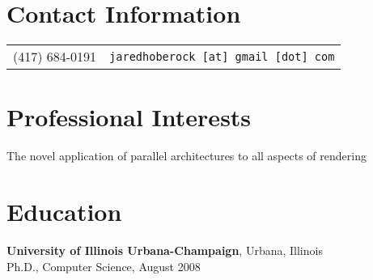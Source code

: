 \documentclass[margin,line]{res}
\newenvironment{list1}{
  \begin{list}{\ding{113}}{%
      \setlength{\itemsep}{0in}
      \setlength{\parsep}{0in} \setlength{\parskip}{0in}
      \setlength{\topsep}{0in} \setlength{\partopsep}{0in}
      \setlength{\leftmargin}{0.17in}}}{\end{list}}
\newenvironment{list2}{
  \begin{list}{$\bullet$}{%
      \setlength{\itemsep}{0in}
      \setlength{\parsep}{0in} \setlength{\parskip}{0in}
      \setlength{\topsep}{0in} \setlength{\partopsep}{0in}
      \setlength{\leftmargin}{0.2in}}}{\end{list}}
\begin{document}
\vspace*{-1.75cm}

\begin{resume}
\section{\sc Contact Information}
\vspace{.05in}


\begin{tabular}{@{}l|l}
(417) 684-0191 & \texttt{jaredhoberock [at] gmail [dot] com} \\
\end{tabular}

\section{\sc Professional Interests}
The novel application of parallel architectures to all aspects of rendering

\section{\sc Education}
{\bf University of Illinois Urbana-Champaign}, Urbana, Illinois\\
Ph.D., Computer Science, August 2008


\end{resume}
\end{document}
